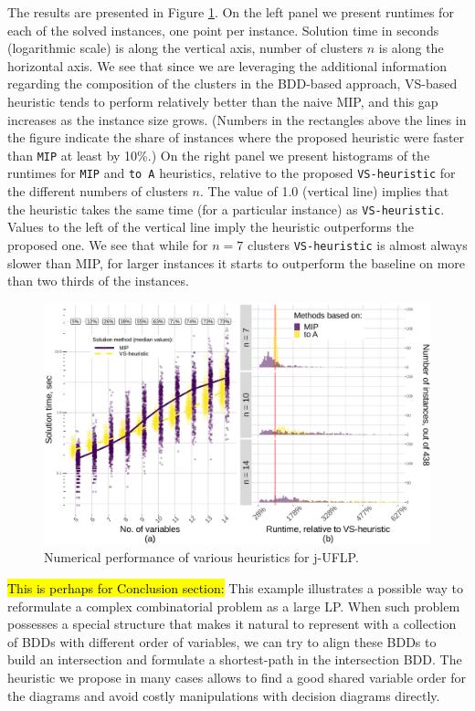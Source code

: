 \documentclass[11pt]{article}
\begin{document}
The results are presented in Figure \ref{fig:jUFLP-nums}. On the left panel we
present runtimes for each of the solved instances, one point per instance.
Solution time in seconds (logarithmic scale) is along the vertical axis, number
of clusters \(n\) is along the horizontal axis. We see that since we are
leveraging the additional information regarding the composition of the clusters
in the BDD-based approach, VS-based heuristic tends to perform relatively better
than the naive MIP, and this gap increases as the instance size grows. (Numbers
in the rectangles above the lines in the figure indicate the share of instances
where the proposed heuristic were faster than \texttt{MIP} at least by 10\%.) On the
right panel we present histograms of the runtimes for \texttt{MIP} and \texttt{to A}
heuristics, relative to the proposed \texttt{VS-heuristic} for the different numbers of
clusters \(n\). The value of 1.0 (vertical line) implies that the heuristic takes
the same time (for a particular instance) as \texttt{VS-heuristic}. Values to the left
of the vertical line imply the heuristic outperforms the proposed one. We see
that while for \(n=7\) clusters \texttt{VS-heuristic} is almost always slower than MIP,
for larger instances it starts to outperform the baseline on more than two
thirds of the instances.

  \begin{figure}%
    \centering
    \includegraphics[width=\textwidth]{./jUFLP.eps}%
    \caption{Numerical performance of various heuristics for j-UFLP.}%
    \label{fig:jUFLP-nums}%
\end{figure}

\hl{This is perhaps for Conclusion section:}
This example illustrates a possible way to reformulate a complex combinatorial
problem as a large LP. When such problem possesses a special structure that
makes it natural to represent with a collection of BDDs with different order of
variables, we can try to align these BDDs to build an intersection and formulate
a shortest-path in the intersection BDD. The heuristic we propose in many cases
allows to find a good shared variable order for the diagrams and avoid costly
manipulations with decision diagrams directly.
\printbibliography
\end{document}

